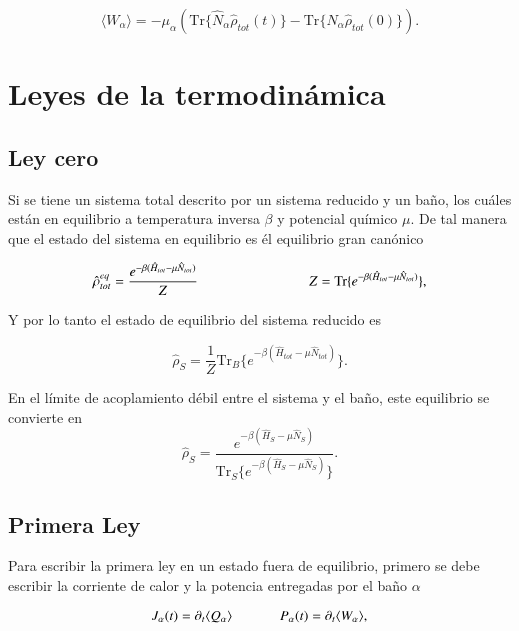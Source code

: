 \begin{equation*}
    \langle W_{\alpha}\rangle = - \mu_{\alpha} (\text{Tr}\{\hat{N}_{\alpha} \hat{\rho}_{tot}(t) \} - \text{Tr}\{\hat{N}_{\alpha}\hat{\rho}_{tot}(0) \}  ).
\end{equation*}
\label{sec3workheat}

\newpage

\section{Leyes de la termodinámica}
\label{Leyestermo}
\subsection{Ley cero}
Si se tiene un sistema total descrito por un sistema reducido y un baño, los cuáles están en equilibrio a temperatura inversa $\beta$ y potencial químico $\mu$. De tal manera que el estado del sistema en equilibrio es él equilibrio gran canónico

\begin{equation*}
    \hat{\rho}^{eq}_{tot} = \frac{e^{-\beta(\hat{H}_{tot} - \mu \hat{N}_{tot})}}{Z}  \hspace{28mm} Z = \text{Tr}\{e^{-\beta(\hat{H}_{tot} - \mu \hat{N}_{tot})} \},
\end{equation*}

Y por lo tanto el estado de equilibrio del sistema reducido es

\begin{equation*}
    \hat{\rho}_{S} = \frac{1}{Z}\text{Tr}_{B}\{ e^{-\beta(\hat{H}_{tot} - \mu \hat{N}_{tot})} \}.
\end{equation*}

En el límite de acoplamiento débil entre el sistema y el baño, este equilibrio se convierte en \cite{geva2000second}
\begin{equation*}
    \hat{\rho}_{S} = \frac{e^{-\beta(\hat{H}_{S} - \mu\hat{N}_{S})}}{\text{Tr}_{S}\{e^{-\beta(\hat{H}_{S} - \mu \hat{N}_{S})} \} }.
\end{equation*}

\subsection{Primera Ley}
Para escribir la primera ley en un estado fuera de equilibrio, primero se debe escribir la corriente de calor y la potencia entregadas por el baño $\alpha$

\begin{equation*}
    J_{\alpha}(t) = \partial_{t}\langle Q_{\alpha}\rangle \hspace{12mm}  P_{\alpha}(t) = \partial_{t}\langle W_{\alpha}\rangle,
\end{equation*}

